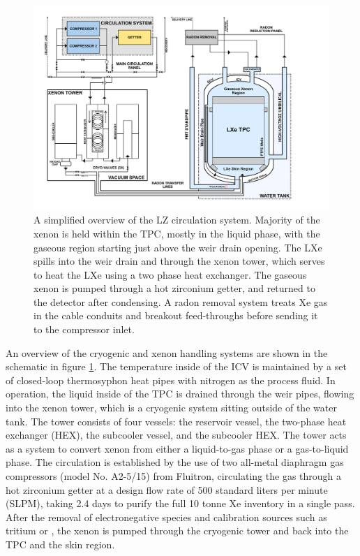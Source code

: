 %
\begin{figure}[b!]
    \centering
    \includegraphics[scale=0.30]{Chapter_2/Figures/LZ_Xenon_Circulation.png}
    \caption[Schematics of the LZ circulation system, detailing TPC, the xenon tower and the compressor systems.]%
    {A simplified overview of the LZ circulation system. Majority of the xenon is held within the TPC, mostly in the liquid phase, with the gaseous region starting just above the weir drain opening. The LXe spills into the weir drain and through the xenon tower, which serves to heat the LXe using a two phase heat exchanger. The gaseous xenon is pumped through a hot zirconium getter, and returned to the detector after condensing. A radon removal system treats Xe gas in the cable conduits and breakout feed-throughs before sending it to the compressor inlet.}
    \label{fig:circulation_diagram}
\end{figure}
%

An overview of the cryogenic and xenon handling systems are shown in the schematic in figure \ref{fig:circulation_diagram}. The temperature inside of the ICV is maintained by a set of closed-loop thermosyphon heat pipes with nitrogen as the process fluid. In operation, the liquid inside of the TPC is drained through the weir pipes, flowing into the xenon tower, which is a cryogenic system sitting outside of the water tank. The tower consists of four vessels: the reservoir vessel, the two-phase heat exchanger (HEX), the subcooler vessel, and the subcooler HEX. The tower acts as a system to convert xenon from either a liquid-to-gas phase or a gas-to-liquid phase. The circulation is established by the use of two all-metal diaphragm gas compressors (model No. A2-5/15) from Fluitron, circulating the gas through a hot zirconium getter at a design flow rate of 500 standard liters per minute (SLPM), taking 2.4 days to purify the full 10 tonne Xe inventory in a single pass. After the removal of electronegative species and calibration sources such as tritium or \COF{}, the xenon is pumped through the cryogenic tower and back into the TPC and the skin region.


